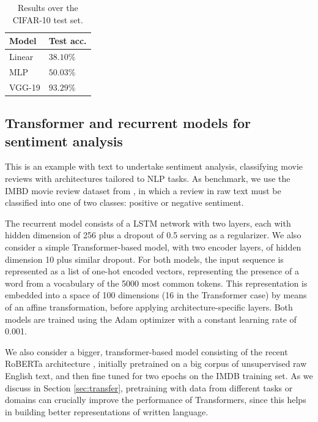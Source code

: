 \begin{table}[ht]
\caption{Results over the CIFAR-10 test set.}
\centering
\begin{tabular}{ll}
Model & Test acc. \\
\hline
Linear &  $38.10\%$ \\
MLP &  $50.03\%$\\
VGG-19 &  $93.29\%$ 
\end{tabular}
\label{tab:cnn}
\end{table}

\subsection{Transformer and recurrent models for sentiment analysis}
This is an example with text to undertake sentiment analysis, classifying movie reviews with architectures tailored to NLP tasks. As benchmark, we use the IMBD movie review dataset 
from \cite{maas-EtAl:2011:ACL-HLT2011}, in which a review in raw text must be classified into one of two classes: positive or negative
sentiment. 

The recurrent model consists of a LSTM network with two layers, each with hidden dimension of 256 plus a dropout of 0.5 serving as a regularizer. We also consider a simple Transformer-based model, with two encoder layers, of hidden dimension 10 plus similar dropout. For both models, the input sequence is represented as a list of one-hot encoded vectors, representing the presence of a word from a vocabulary of the 5000 most common tokens. This representation is embedded into a space of 100 dimensions
(16 in the Transformer case) by means of an affine transformation, before applying architecture-specific layers. Both models are trained using the Adam optimizer with a constant learning rate of 0.001.

We also consider a bigger, transformer-based model consisting of the recent RoBERTa architecture \cite{liu2019roberta}, 
initially pretrained on a big corpus of unsupervised raw  English text, and then fine tuned for two epochs on the IMDB training set. As we 
 discuss in Section \ref{sec:transfer}, pretraining with data from different tasks or domains can crucially improve the performance of Transformers, since this helps in building better representations of written language.

